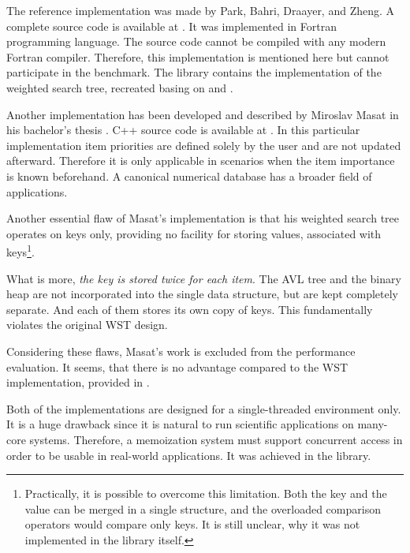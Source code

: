 
The reference implementation was made by Park, Bahri, Draayer, and Zheng. A complete source code is available at \cite{wstree}. It was implemented in Fortran programming language. The source code cannot be compiled with any modern Fortran compiler\cite{masat}. Therefore, this implementation is mentioned here but cannot participate in the benchmark. The \numdbname library contains the implementation of the weighted search tree, recreated basing on \cite{park90} and \cite{park94}.

Another implementation has been developed and described by Miroslav Masat in his bachelor’s thesis \cite{masat}. C++ source code is available at \cite{ccherish}. In this particular implementation item priorities are defined solely by the user and are not updated afterward. Therefore it is only applicable in scenarios when the item importance is known beforehand. A canonical numerical database has a broader field of applications.

Another essential flaw of Masat's implementation is that his weighted search tree operates on keys only, providing no facility for storing values, associated with keys\footnote{Practically, it is possible to overcome this limitation. Both the key and the value can be merged in a single structure, and the overloaded comparison operators would compare only keys. It is still unclear, why it was not implemented in the library itself.}.

What is more, \emph{the key is stored twice for each item}. The AVL tree and the binary heap are not incorporated into the single data structure, but are kept completely separate. And each of them stores its own copy of keys. This fundamentally violates the original WST design.

Considering these flaws, Masat's work is excluded from the performance evaluation. It seems, that there is no advantage compared to the WST implementation, provided in \numdbname.

Both of the implementations are designed for a single-threaded environment only. It is a huge drawback since it is natural to run scientific applications on many-core systems. Therefore, a memoization system must support concurrent access in order to be usable in real-world applications. It was achieved in the \numdbname library.

